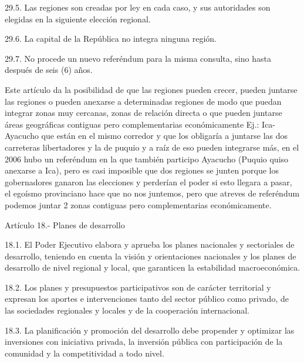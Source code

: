 \documentclass[
  a4paper,
]{article}
\begin{document}
29.5. Las regiones son creadas por ley en cada caso, y sus autoridades
son elegidas en la siguiente elección regional.

29.6. La capital de la República no integra ninguna región.

29.7. No procede un nuevo referéndum para la misma consulta, sino hasta
después de seis (6) años.

Este artículo da la posibilidad de que las regiones pueden crecer,
pueden juntarse las regiones o pueden anexarse a determinadas regiones
de modo que puedan integrar zonas muy cercanas, zonas de relación
directa o que pueden juntarse áreas geográficas contiguas pero
complementarias económicamente Ej.: Ica-Ayacucho que están en el mismo
corredor y que los obligaría a juntarse las dos carreteras libertadores
y la de puquio y a raíz de eso pueden integrarse más, en el 2006 hubo un
referéndum en la que también participo Ayacucho (Puquio quiso anexarse a
Ica), pero es casi imposible que dos regiones se junten porque los
gobernadores ganaron las elecciones y perderían el poder si esto llegara
a pasar, el egoísmo provinciano hace que no nos juntemos, pero que
atreves de referéndum podemos juntar 2 zonas contiguas pero
complementarias económicamente.

Artículo 18.- Planes de desarrollo

18.1. El Poder Ejecutivo elabora y aprueba los planes nacionales y
sectoriales de desarrollo, teniendo en cuenta la visión y orientaciones
nacionales y los planes de desarrollo de nivel regional y local, que
garanticen la estabilidad macroeconómica.

18.2. Los planes y presupuestos participativos son de carácter
territorial y expresan los aportes e intervenciones tanto del sector
público como privado, de las sociedades regionales y locales y de la
cooperación internacional.

18.3. La planificación y promoción del desarrollo debe propender y
optimizar las inversiones con iniciativa privada, la inversión pública
con participación de la comunidad y la competitividad a todo nivel.
\end{document}
